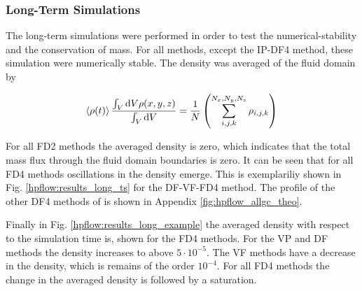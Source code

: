\subsubsection{Long-Term Simulations}

The long-term simulations were performed in order to test the numerical-stability and the conservation of mass.
For all methods, except the IP-DF4 method, these simulation were numerically stable.
The density was averaged of the fluid domain by

\begin{align}
    \label{vali:density_calc}
    \left<\rho(t)\right> \frac{\int_V \mathop{}\!\mathrm{d} V \rho(x,y,z)}{\int_V \mathop{}\!\mathrm{d} V} =
    \frac{1}{N}\left(\sum_{i,j,k}^{N_x, N_y, N_z} \rho_{i,j,k}\right)
\end{align}


For all FD2 methods the averaged density is zero, which indicates that the total mass flux through the
fluid domain boundaries is zero.
It can be seen that for all FD4 methods oscillations in the density emerge.
This is exemplariliy shown in Fig.  \ref{hpflow:results_long_ts} for the DF-VF-FD4 method.
The profile of the other DF4 methods of is shown in Appendix \ref{fig:hpflow_allgc_theo}.

Finally in Fig. \ref{hpflow:results_long_example} the averaged density with respect to the simulation time is, shown for the
FD4 methods.  For the VP and DF methods the density increases to above $5\cdot10^{-5}$.
The VF methods have a decrease in the density, which is remains of the order $10^{-4}$.
For all FD4 methods the change in the averaged density is followed by a saturation.

